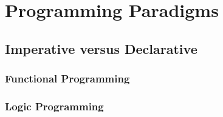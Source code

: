 

\toclineskip
\section{Programming Paradigms}



\subsection{Imperative versus Declarative}

\subsubsection{Functional Programming}

\subsubsection{Logic Programming}

